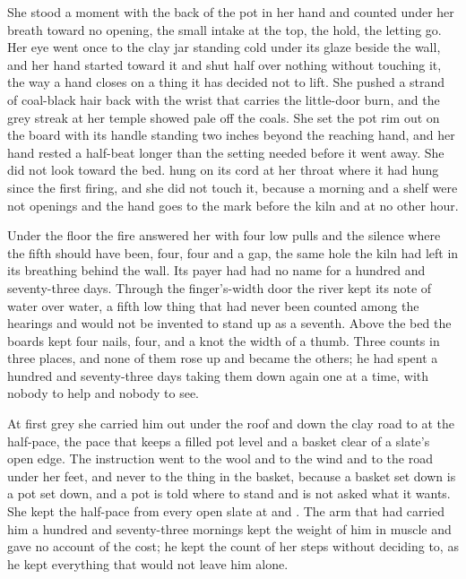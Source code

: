She stood a moment with the back of the pot in her hand and counted under her breath toward no opening, the small intake at the top, the hold, the letting go. Her eye went once to the clay jar standing cold under its glaze beside the wall, and her hand started toward it and shut half over nothing without touching it, the way a hand closes on a thing it has decided not to lift. She pushed a strand of coal-black hair back with the wrist that carries the little-door burn, and the grey streak at her temple showed pale off the coals. She set the pot rim out on the board with its handle standing two inches beyond the reaching hand, and her hand rested a half-beat longer than the setting needed before it went away. She did not look toward the bed.  hung on its cord at her throat where it had hung since the first firing, and she did not touch it, because a morning and a shelf were not openings and the hand goes to the mark before the kiln and at no other hour.

Under the floor the fire answered her with four low pulls and the silence where the fifth should have been, four, four and a gap, the same hole the kiln had left in its breathing behind the wall. Its payer had had no name for a hundred and seventy-three days. Through the finger's-width door the river kept its note of water over water, a fifth low thing that had never been counted among the hearings and would not be invented to stand up as a seventh. Above the bed the boards kept four nails, four, and a knot the width of a thumb. Three counts in three places, and none of them rose up and became the others; he had spent a hundred and seventy-three days taking them down again one at a time, with nobody to help and nobody to see.

\scenebreak

At first grey she carried him out under the roof and down the clay road to  at the half-pace, the pace that keeps a filled pot level and a basket clear of a slate's open edge. The instruction went to the wool and to the wind and to the road under her feet, and never to the thing in the basket, because a basket set down is a pot set down, and a pot is told where to stand and is not asked what it wants. She kept the half-pace from every open slate at  and . The arm that had carried him a hundred and seventy-three mornings kept the weight of him in muscle and gave no account of the cost; he kept the count of her steps without deciding to, as he kept everything that would not leave him alone.

